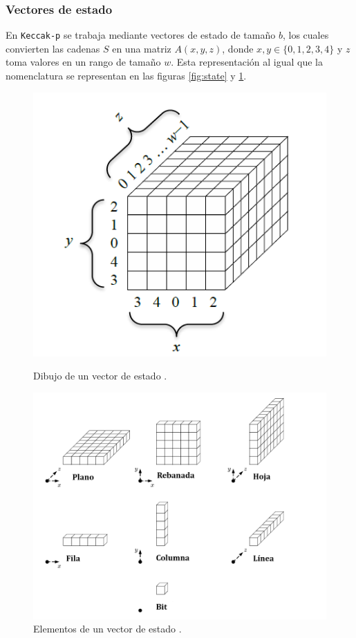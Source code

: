 \subsubsection{Vectores de estado}
En \texttt{Keccak-p} se trabaja mediante vectores de estado de tamaño \(b\), los cuales convierten las cadenas \(S\) en una matriz \(A(x,y,z)\), donde \(x, y \in \{0,1,2,3,4\}\) y \(z\) toma valores en un rango de tamaño \(w\). Esta representación al igual que la nomenclatura se representan en las figuras \ref{fig:state} y \ref{fig:partsstate}.
\begin{figure}[h]
	\centering
	\begin{minipage}{0.48\textwidth}
		\centering
		\includegraphics[width=1\linewidth]{figuras/State}
		\caption{\small Dibujo de un vector de estado \cite{FIPS202}.}
		\label{fig:state}
	\end{minipage}\hfill
	\begin{minipage}{0.51\textwidth}
		\centering
		\includegraphics[width=1\linewidth]{figuras/PartsState}
		\caption{ \small Elementos de un vector de estado \cite{FIPS202}.}
		\label{fig:partsstate}
	\end{minipage}
\end{figure}


